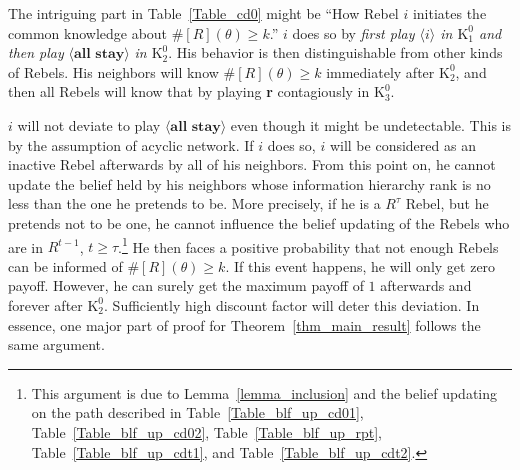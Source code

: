 \documentclass[12pt,letter]{article}
\newcommand{\Kappa}{\mathrm{K}}
\theoremstyle{definition}
\theoremstyle{remark}
\theoremstyle{claim}
\begin{document}
The intriguing part in Table~\ref{Table_cd0} might be ``How Rebel $i$ initiates the common knowledge about $\#[R](\theta)\geq k$.'' $i$ does so by \textit{first play $\langle i \rangle$ in $\Kappa^0_{1}$ and then play} $\langle \textbf{all stay} \rangle$ \textit{in $\Kappa^0_{2}$}. His behavior is then distinguishable from other kinds of Rebels. His neighbors will know $\#[R](\theta)\geq k$ immediately after $\Kappa^0_{2}$, and then all Rebels will know that by playing \textbf{r} contagiously in $\Kappa^0_{3}$. 

$i$ will not deviate to play $\langle \textbf{all stay} \rangle$ even though it might be undetectable. This is by the assumption of acyclic network. If $i$ does so, $i$ will be considered as an inactive Rebel afterwards by all of his neighbors. From this point on, he cannot update the belief held by his neighbors whose information hierarchy rank is no less than the one he pretends to be. More precisely, if he is a $R^{\tau}$ Rebel, but he pretends not to be one, he cannot influence the belief updating of the Rebels who are in $R^{t-1}$, $t\geq \tau$.\footnote{This argument is due to Lemma~\ref{lemma_inclusion} and the belief updating on the path described in Table~\ref{Table_blf_up_cd01}, Table~\ref{Table_blf_up_cd02}, Table~\ref{Table_blf_up_rpt}, Table~\ref{Table_blf_up_cdt1}, and Table~\ref{Table_blf_up_cdt2}.} 
He then faces a positive probability that not enough Rebels can be informed of $\#[R](\theta)\geq k$. If this event happens, he will only get zero payoff. However, he can surely get the maximum payoff of $1$ afterwards and forever after $\Kappa^0_2$. Sufficiently high discount factor will deter this deviation. In essence, one major part of proof for Theorem~\ref{thm_main_result} follows the same argument.

\end{document}
